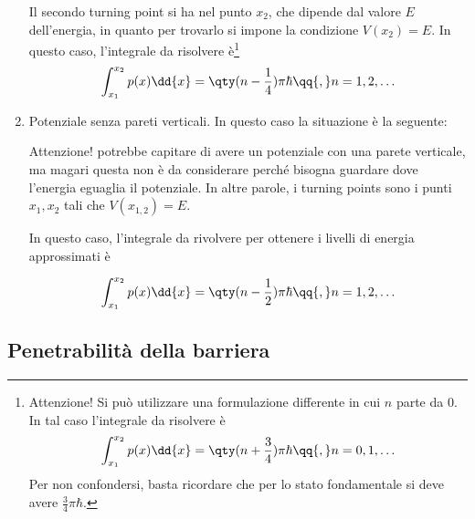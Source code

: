 \begin{enumerate}[leftmargin=0.6cm]
   Il secondo turning point si ha nel punto $x_2$, che dipende dal valore $E$ dell'energia, in quanto per trovarlo si impone la condizione $V(x_2)=E$. In questo caso, l'integrale da risolvere è\footnote{Attenzione! Si può utilizzare una formulazione differente in cui $n$ parte da $0$. In tal caso l'integrale da risolvere è
   \begin{equation*}
      \int_{x_1}^{x_2} p(x) \dd{x}=\qty( n + \frac{3}{4} )\pi\hbar
      \qq{,}
      n=0,1,\ldots
   \end{equation*}
   Per non confondersi, basta ricordare che per lo stato fondamentale si deve avere $\frac{3}{4}\pi\hbar$.}
   \begin{equation*}
      \int_{x_1}^{x_2} p(x) \dd{x}=\qty( n - \frac{1}{4} )\pi\hbar
      \qq{,}
      n=1,2,\ldots
   \end{equation*}
   
   \item Potenziale senza pareti verticali.
   In questo caso la situazione è la seguente:
   
   \begin{figure}[H]
      \centering
   \end{figure}

   Attenzione! potrebbe capitare di avere un potenziale con una parete verticale, ma magari questa non è da considerare perché bisogna guardare dove l'energia eguaglia il potenziale. In altre parole, i turning points sono i punti $x_1, x_2$ tali che $V(x_{1,2})=E$.
   
   In questo caso, l'integrale da rivolvere per ottenere i livelli di energia approssimati è

   \begin{equation*}
      \int_{x_1}^{x_2} p(x) \dd{x}=\qty( n - \frac{1}{2} )\pi\hbar
      \qq{,}
      n=1,2,\ldots
   \end{equation*}

\end{enumerate}


\subsection*{Penetrabilità della barriera}

